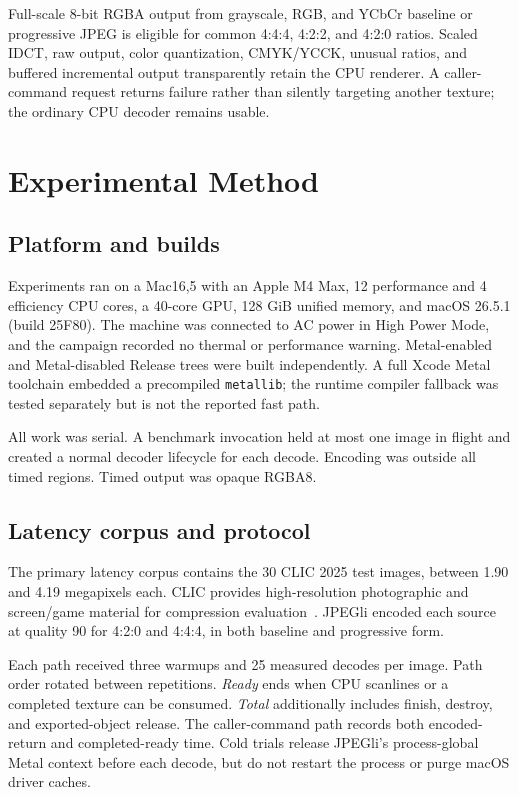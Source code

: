 \documentclass[10pt,twocolumn]{article}
\newcommand{\code}[1]{\texttt{#1}}
\begin{document}
Full-scale 8-bit RGBA output from grayscale, RGB, and YCbCr baseline or
progressive JPEG is eligible for common 4:4:4, 4:2:2, and 4:2:0 ratios.
Scaled IDCT, raw output, color quantization, CMYK/YCCK, unusual ratios, and
buffered incremental output transparently retain the CPU renderer.  A
caller-command request returns failure rather than silently targeting another
texture; the ordinary CPU decoder remains usable.

\section{Experimental Method}
\label{sec:method}

\subsection{Platform and builds}

Experiments ran on a Mac16,5 with an Apple M4 Max, 12 performance and 4
efficiency CPU cores, a 40-core GPU, 128 GiB unified memory, and macOS 26.5.1
(build 25F80).  The machine was connected to AC power in High Power Mode, and
the campaign recorded no thermal or performance warning.  Metal-enabled and
Metal-disabled Release trees were built independently.  A full Xcode Metal
toolchain embedded a precompiled \code{metallib}; the runtime compiler
fallback was tested separately but is not the reported fast path.

All work was serial.  A benchmark invocation held at most one image in flight
and created a normal decoder lifecycle for each decode.  Encoding was outside
all timed regions.  Timed output was opaque RGBA8.

\subsection{Latency corpus and protocol}

The primary latency corpus contains the 30 CLIC 2025 test images, between 1.90
and 4.19 megapixels each.  CLIC provides high-resolution photographic and
screen/game material for compression evaluation~\cite{clic2025}.  JPEGli
encoded each source at quality 90 for 4:2:0 and 4:4:4, in both baseline and
progressive form.

Each path received three warmups and 25 measured decodes per image.  Path
order rotated between repetitions.  \emph{Ready} ends when CPU scanlines or a
completed texture can be consumed.  \emph{Total} additionally includes
finish, destroy, and exported-object release.  The caller-command path records
both encoded-return and completed-ready time.  Cold trials release JPEGli's
process-global Metal context before each decode, but do not restart the
process or purge macOS driver caches.
\end{document}
